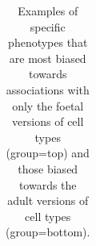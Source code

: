 \documentclass[
]{article}
\begin{document}
\newpage{}

\begin{longtable}[]{@{}
  >{\raggedright\arraybackslash}p{}
  >{\raggedright\arraybackslash}p{}
  >{\raggedright\arraybackslash}p{}
  >{\raggedright\arraybackslash}p{}
  >{\raggedright\arraybackslash}p{}
  >{\raggedleft\arraybackslash}p{}@{}}

\caption{\label{tbl-foetal_examples}Examples of specific phenotypes that
are most biased towards associations with only the foetal versions of
cell types (group=top) and those biased towards the adult versions of
cell types (group=bottom).}

\tabularnewline


\end{longtable}
\end{document}
